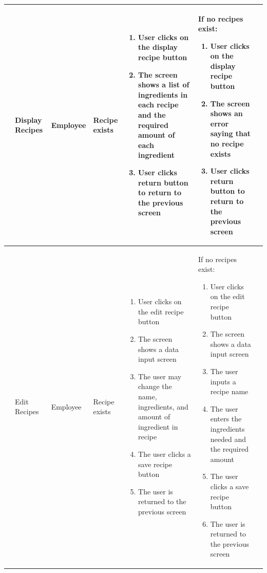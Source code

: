 \begin{landscape}
\begin{longtable}{|p{}|p{}|p{}|p{}|p{}|p{}|p{}|}
	 \rownumber & Display Recipes & Employee & Recipe exists & 
	\begin{enumerate}[wide, labelwidth=!, labelindent=0pt, nosep, topsep=0pt, parsep=0pt]
		\item User clicks on the display recipe button
		\item The screen shows a list of ingredients in each recipe and the required amount of each ingredient
		\item User clicks return button to return to the previous screen
	\end{enumerate} & If no recipes exist:\begin{enumerate}[wide, labelwidth=!, labelindent=0pt, nosep, topsep=0pt, parsep=0pt]
		\item User clicks on the display recipe button
		\item The screen shows an error saying that no recipe exists
		\item User clicks return button to return to the previous screen
	\end{enumerate} & \\\hline
	 \rownumber & Edit Recipes & Employee & Recipe exists & 
\begin{enumerate}[wide, labelwidth=!, labelindent=0pt, nosep, topsep=0pt, parsep=0pt]
	\item User clicks on the edit recipe button
	\item The screen shows a data input screen
	\item The user may change the name, ingredients, and amount of ingredient in recipe
	\item The user clicks a save recipe button
	\item The user is returned to the previous screen
\end{enumerate} & If no recipes exist:\begin{enumerate}[wide, labelwidth=!, labelindent=0pt, nosep, topsep=0pt, parsep=0pt]
	\item User clicks on the edit recipe button
	\item The screen shows a data input screen
	\item The user inputs a recipe name
	\item The user enters the ingredients needed and the required amount
	\item The user clicks a save recipe button
	\item The user is returned to the previous screen
\end{enumerate} & \\\hline

\end{longtable}
\end{landscape}
